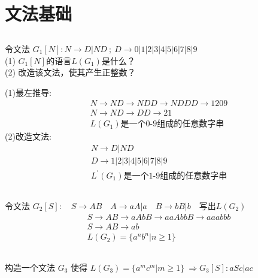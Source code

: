 \documentclass{article}
\title{
\vspace{2in}
\huge{\textbf{\hmwkClass \  \hmwkTitle}}\\
\vspace{2.5in}
}
\author{\textbf{\hmwkAuthorName}}
\date{\hmwkClassTime}
\begin{document}
\maketitle
\thispagestyle{empty}

\newpage

\section{文法基础}
\subsection{}
\noindent
令文法 $G_1[N]:N \rightarrow D |ND \ ; \ D \rightarrow 0|1|2|3|4|5|6|7|8|9$\\
(1) $G_1[N]$的语言$L(G_1)$是什么？ \\
(2) 改造该文法，使其产生正整数？\par
\noindent
(1)最左推导:
\begin{align*}
       & N \rightarrow ND \rightarrow NDD \rightarrow NDDD \rightarrow 1209 \\
       & N \rightarrow ND \rightarrow DD \rightarrow 21                     \\
       & \text{$L(G_1)$是一个0-9组成的任意数字串}
\end{align*}
\noindent
(2)改造文法:
\begin{align*}
       & N \rightarrow D |ND                          \\
       & D \rightarrow 1|2|3|4|5|6|7|8|9              \\
       & \text{$L^{'}(G_1)$是一个1-9组成的任意数字串}
\end{align*}
\subsection{}
\noindent
令文法 $G_2[S]:\quad S \rightarrow AB \quad A \rightarrow aA|a \quad B \rightarrow bB|b \quad \text{写出} L(G_2)$
\begin{align*}
       & S \rightarrow AB \rightarrow aAbB \rightarrow aaAbbB \rightarrow aaabbb \\
       & S \rightarrow AB \rightarrow ab                                         \\
       & L(G_2)=\{a^nb^n|n \geq  1\}
\end{align*}
\subsection{}
\noindent
构造一个文法 $G_3$ 使得 $L(G_3)=\{a^mc^m|m \geq 1\} \ \Rightarrow G_3[S]:aSc|ac$
\end{document}
